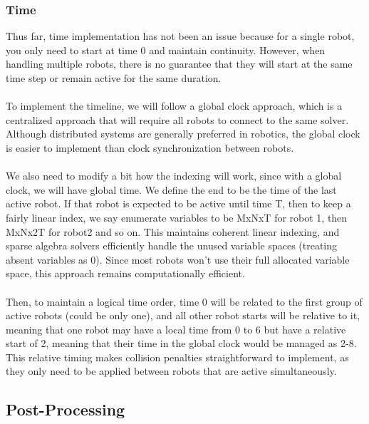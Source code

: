 \documentclass[11pt]{article}
\begin{document}
\subsubsection{Time}

Thus far, time implementation has not been an issue because for a single robot, you only need to start at time 0 and maintain continuity. However, when handling multiple robots, there is no guarantee that they will start at the same time step or remain active for the same duration.\\
\\
To implement the timeline, we will follow a global clock approach, which is a centralized approach that will require all robots to connect to the same solver. Although distributed systems are generally preferred in robotics, the global clock is easier to implement than clock synchronization between robots.\\
\\
We also need to modify a bit how the indexing will work, since with a global clock, we will have global time. We define the end to be the time of the last active robot. If that robot is expected to be active until time T, then to keep a fairly linear index, we say enumerate variables to be MxNxT for robot 1, then MxNx2T for robot2 and so on. This maintains coherent linear indexing, and sparse algebra solvers efficiently handle the unused variable spaces (treating absent variables as 0). Since most robots won't use their full allocated variable space, this approach remains computationally efficient.\\
\\
Then, to maintain a logical time order, time 0 will be related to the first group of active robots (could be only one), and all other robot starts will be relative to it, meaning that one robot may have a local time from 0 to 6 but have a relative start of 2, meaning that their time in the global clock would be managed as 2-8. This relative timing makes collision penalties straightforward to implement, as they only need to be applied between robots that are active simultaneously.

\subsection{Post-Processing}
\end{document}

